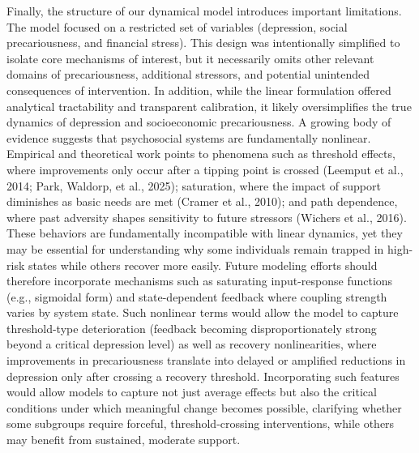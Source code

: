 \documentclass[
]{article}
\begin{document}
Finally, the structure of our dynamical model introduces important
limitations. The model focused on a restricted set of variables
(depression, social precariousness, and financial stress). This design
was intentionally simplified to isolate core mechanisms of interest, but
it necessarily omits other relevant domains of precariousness,
additional stressors, and potential unintended consequences of
intervention. In addition, while the linear formulation offered
analytical tractability and transparent calibration, it likely
oversimplifies the true dynamics of depression and socioeconomic
precariousness.
\textcolor{BrickRed}{A growing body of evidence suggests that psychosocial systems are fundamentally nonlinear. Empirical and theoretical work points to phenomena such as threshold effects, where improvements only occur after a tipping point is crossed}
(Leemput et al., 2014; Park, Waldorp, et al., 2025);
\textcolor{BrickRed}{saturation, where the impact of support diminishes as basic needs are met}
(Cramer et al., 2010);
\textcolor{BrickRed}{and path dependence, where past adversity shapes sensitivity to future stressors}
(Wichers et al., 2016).
\textcolor{BrickRed}{These behaviors are fundamentally incompatible with linear dynamics, yet they may be essential for understanding why some individuals remain trapped in high-risk states while others recover more easily. Future modeling efforts should therefore incorporate mechanisms such as saturating input-response functions (e.g., sigmoidal form) and state-dependent feedback where coupling strength varies by system state. Such nonlinear terms would allow the model to capture threshold-type deterioration (feedback becoming disproportionately strong beyond a critical depression level) as well as recovery nonlinearities, where improvements in precariousness translate into delayed or amplified reductions in depression only after crossing a recovery threshold. Incorporating such features would allow models to capture not just average effects but also the critical conditions under which meaningful change becomes possible, clarifying whether some subgroups require forceful, threshold-crossing interventions, while others may benefit from sustained, moderate support.}
\end{document}
